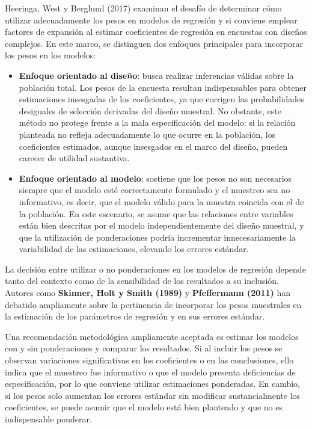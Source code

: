 \documentclass[
  12pt,
]{book}
\begin{document}
Heeringa, West y Berglund (2017) examinan el desafío de determinar cómo utilizar adecuadamente los pesos en modelos de regresión y si conviene emplear factores de expansión al estimar coeficientes de regresión en encuestas con diseños complejos. En este marco, se distinguen dos enfoques principales para incorporar los pesos en los modelos:

\begin{itemize}
\item
  \textbf{Enfoque orientado al diseño}: busca realizar inferencias válidas sobre la población total. Los pesos de la encuesta resultan indispensables para obtener estimaciones insesgadas de los coeficientes, ya que corrigen las probabilidades desiguales de selección derivadas del diseño muestral. No obstante, este método no protege frente a la mala especificación del modelo: si la relación planteada no refleja adecuadamente lo que ocurre en la población, los coeficientes estimados, aunque insesgados en el marco del diseño, pueden carecer de utilidad sustantiva.
\item
  \textbf{Enfoque orientado al modelo}: sostiene que los pesos no son necesarios siempre que el modelo esté correctamente formulado y el muestreo sea no informativo, es decir, que el modelo válido para la muestra coincida con el de la población. En este escenario, se asume que las relaciones entre variables están bien descritas por el modelo independientemente del diseño muestral, y que la utilización de ponderaciones podría incrementar innecesariamente la variabilidad de las estimaciones, elevando los errores estándar.
\end{itemize}

La decisión entre utilizar o no ponderaciones en los modelos de regresión depende tanto del contexto como de la sensibilidad de los resultados a su inclusión. Autores como \textbf{Skinner, Holt y Smith (1989)} y \textbf{Pfeffermann (2011)} han debatido ampliamente sobre la pertinencia de incorporar los pesos muestrales en la estimación de los parámetros de regresión y en sus errores estándar.

Una recomendación metodológica ampliamente aceptada es estimar los modelos con y sin ponderaciones y comparar los resultados. Si al incluir los pesos se observan variaciones significativas en los coeficientes o en las conclusiones, ello indica que el muestreo fue informativo o que el modelo presenta deficiencias de especificación, por lo que conviene utilizar estimaciones ponderadas. En cambio, si los pesos solo aumentan los errores estándar sin modificar sustancialmente los coeficientes, se puede asumir que el modelo está bien planteado y que no es indispensable ponderar.
\end{document}
